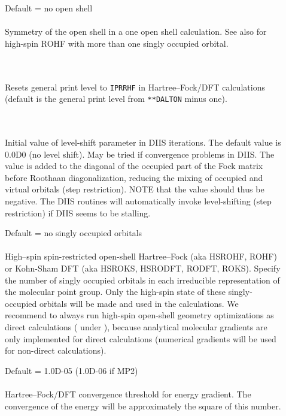 \begin{description}
\item[]
  Default = no open shell\\
   \\
  Symmetry of the open shell in a one open shell
  calculation. See also  for high-spin ROHF with more than one
  singly occupied orbital.

\item[] \ \\
   \\
  Resets general print level to \verb|IPRRHF| in Hartree--Fock/DFT calculations
  (default is the general print level from \verb|**DALTON| minus one).

\item[]  \ \\
   \\
  Initial value of level-shift parameter in DIIS iterations. 
  The default value is 0.0D0 (no level shift).
  May be tried if convergence problems in DIIS. The value is added
  to the diagonal of the occupied part of the Fock matrix before
  Roothaan diagonalization, reducing the mixing of occupied and
  virtual orbitals (step restriction).
  NOTE that the value should thus be negative.  The DIIS routines
  will automatically invoke level-shifting (step restriction) if
  DIIS seems to be stalling.

\item[] Default = no singly occupied orbitals \\
     \\
  High--spin spin-restricted open-shell Hartree--Fock (aka HSROHF, ROHF)
  or Kohn-Sham DFT (aka HSROKS, HSRODFT, RODFT, ROKS).
  Specify the number of singly occupied orbitals in each irreducible representation
  of the molecular point group. Only the high-spin state of these
  singly-occupied orbitals will be made and used in the calculations.
  We recommend to always run high-spin open-shell geometry optimizations as direct calculations
  ( under ),
  because analytical molecular gradients are only implemented for direct calculations
  (numerical gradients will be used for non-direct calculations).

\item[]
  Default = 1.0D-05 (1.0D-06 if MP2)\\
   \\
  Hartree--Fock/DFT convergence threshold for energy gradient.  The convergence
  of the energy will be approximately the square of this number.

\end{description}


